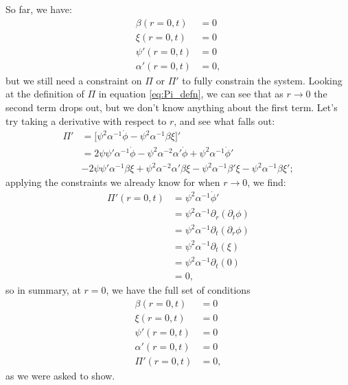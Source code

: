 \documentclass[12pt]{article}
\numberwithin{equation}{section}
\begin{document}
So far, we have:
\begin{equation*}
\begin{aligned}
\beta  (r=0, t) &= 0 \\
\xi    (r=0, t) &= 0 \\
\psi'  (r=0, t) &= 0 \\
\alpha'(r=0, t) &= 0,
\end{aligned}
\end{equation*}
but we still need a constraint on $\Pi$ or $\Pi'$ to fully constrain the system.  Looking at the definition of $\Pi$ in equation \ref{eq:Pi_defn}, we can see that as $r \to 0$ the second term drops out, but we don't know anything about the first term.  Let's try taking a derivative with respect to $r$, and see what falls out:
\begin{equation*}
\begin{aligned}
\Pi' &= \Big[ \psi^2 \alpha^{-1} \dot{\phi} - \psi^2 \alpha^{-1} \beta \xi \Big]' \\
&= 2 \psi \psi' \alpha^{-1} \dot{\phi} - \psi^2 \alpha^{-2} \alpha' \dot{\phi} + \psi^2 \alpha^{-1} \dot{\phi}' \\
&- 2 \psi \psi' \alpha^{-1} \beta \xi + \psi^2 \alpha^{-2} \alpha' \beta \xi - \psi^2 \alpha^{-1} \beta' \xi - \psi^2 \alpha^{-1} \beta \xi';
\end{aligned}
\end{equation*}
applying the constraints we already know for when $r \to 0$, we find:
\begin{equation*}
\begin{aligned}
\Pi'(r=0, t) &= \psi^2 \alpha^{-1} \dot{\phi}' \\
&= \psi^2 \alpha^{-1} \partial_r (\partial_t \phi) \\
&= \psi^2 \alpha^{-1} \partial_t (\partial_r \phi) \\
&= \psi^2 \alpha^{-1} \partial_t (\xi) \\
&= \psi^2 \alpha^{-1} \partial_t (0) \\
&= 0,
\end{aligned}
\end{equation*}
so in summary, at $r = 0$, we have the full set of conditions
\begin{equation}
\begin{aligned}
\beta  (r=0, t) &= 0 \\
\xi    (r=0, t) &= 0 \\
\psi'  (r=0, t) &= 0 \\
\alpha'(r=0, t) &= 0 \\
\Pi'   (r=0, t) &= 0,
\end{aligned}
\end{equation}
as we were asked to show.
\end{document}
